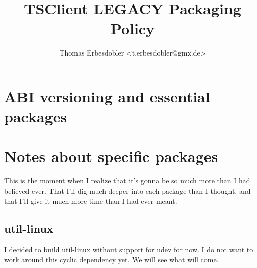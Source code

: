 \documentclass[a4paper]{article}
\title{TSClient LEGACY Packaging Policy}
\author{Thomas Erbesdobler <t.erbesdobler@gmx.de>}
\begin{document}
	\maketitle
	\tableofcontents

	\section{ABI versioning and essential packages}
	
	\section{Notes about specific packages}
	
	This is the moment when I realize that it's gonna be so much more than I had believed ever. That I'll dig much deeper into each package than I thought, and that I'll give it much more time than I had ever meant.
	
	\subsection{util-linux}
	
	I decided to build util-linux without support for udev for now. I do not want to work around this cyclic dependency yet. We will see what will come.
\end{document}

